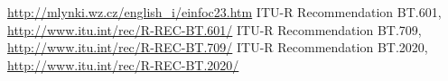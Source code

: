 \begin{thebibliography}{99}

    \url{http://mlynki.wz.cz/english_i/einfoc23.htm}
     ITU-R Recommendation BT.601,
    \url{http://www.itu.int/rec/R-REC-BT.601/}
     ITU-R Recommendation BT.709,
    \url{http://www.itu.int/rec/R-REC-BT.709/}
     ITU-R Recommendation BT.2020,
    \url{http://www.itu.int/rec/R-REC-BT.2020/}
    
\end{thebibliography}


